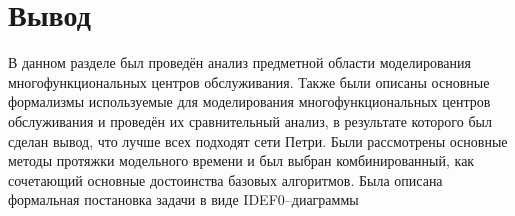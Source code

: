 \FloatBarrier

\FloatBarrier

\section*{Вывод}

В данном разделе был проведён анализ предметной области моделирования многофункциональных центров обслуживания. Также были описаны основные формализмы используемые для моделирования многофункциональных центров обслуживания и проведён их сравнительный анализ, в результате которого был сделан вывод, что лучше всех подходят сети Петри. Были рассмотрены основные методы протяжки модельного времени и был выбран комбинированный, как сочетающий основные достоинства базовых алгоритмов. Была описана формальная постановка задачи в виде IDEF0--диаграммы
